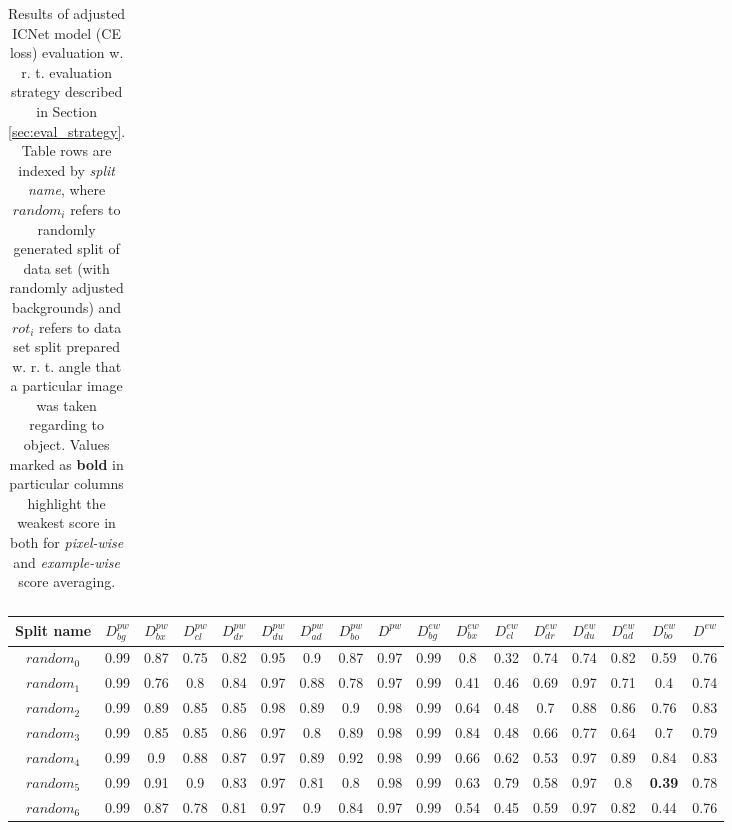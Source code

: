 \documentclass{article}
\begin{document}
\begin{center}
\begin{table}[H]
\begin{tabular}{ |c|c|c|c|c|c|c|c|c||c|c|c|c|c|c|c|c| }
\end{tabular} 
\caption{Results of adjusted ICNet \cite{icnet} model (CE loss) evaluation w. r. t. evaluation strategy described in Section \ref{sec:eval_strategy}. Table rows are indexed by \textit{split name}, where $random_i$ refers to randomly generated split of data set (with randomly adjusted backgrounds) and $rot_i$ refers to data set split prepared w. r. t. angle that a particular image was taken regarding to object. Values marked as \textbf{bold} in particular columns highlight the weakest score in both for \textit{pixel-wise} and \textit{example-wise} score averaging.}
\label{tab:icnet_ce_results}
\end{table}
\end{center}


\begin{center}
\begin{table}[H]
\tiny \renewcommand{\arraystretch}{1.5} \begin{tabular}{ |c|c|c|c|c|c|c|c|c||c|c|c|c|c|c|c|c| } \hline Split name & $D^{pw}_{bg}$ & $D^{pw}_{bx}$ & $D^{pw}_{cl}$ & $D^{pw}_{dr}$ & $D^{pw}_{du}$ & $D^{pw}_{ad}$ & $D^{pw}_{bo}$ & $D^{pw}$ &  $D^{ew}_{bg}$ & $D^{ew}_{bx}$ & $D^{ew}_{cl}$ & $D^{ew}_{dr}$ & $D^{ew}_{du}$ & $D^{ew}_{ad}$ & $D^{ew}_{bo}$ & $D^{ew}$ \\ [1.05ex] \hline 
$random_0$ &  0.99 & 0.87 & 0.75 & 0.82 & 0.95 & 0.9 & 0.87 & 0.97 &  0.99 & 0.8 & 0.32 & 0.74 & 0.74 & 0.82 & 0.59 & 0.76 \\ \hline 
$random_1$ &  0.99 & 0.76 & 0.8 & 0.84 & 0.97 & 0.88 & 0.78 & 0.97 &  0.99 & 0.41 & 0.46 & 0.69 & 0.97 & 0.71 & 0.4 & 0.74 \\ \hline 
$random_2$ &  0.99 & 0.89 & 0.85 & 0.85 & 0.98 & 0.89 & 0.9 & 0.98 &  0.99 & 0.64 & 0.48 & 0.7 & 0.88 & 0.86 & 0.76 & 0.83 \\ \hline 
$random_3$ &  0.99 & 0.85 & 0.85 & 0.86 & 0.97 & 0.8 & 0.89 & 0.98 &  0.99 & 0.84 & 0.48 & 0.66 & 0.77 & 0.64 & 0.7 & 0.79 \\ \hline 
$random_4$ &  0.99 & 0.9 & 0.88 & 0.87 & 0.97 & 0.89 & 0.92 & 0.98 &  0.99 & 0.66 & 0.62 & 0.53 & 0.97 & 0.89 & 0.84 & 0.83 \\ \hline 
$random_5$ &  0.99 & 0.91 & 0.9 & 0.83 & 0.97 & 0.81 & 0.8 & 0.98 &  0.99 & 0.63 & 0.79 & 0.58 & 0.97 & 0.8 & \textbf{0.39} & 0.78 \\ \hline 
$random_6$ &  0.99 & 0.87 & 0.78 & 0.81 & 0.97 & 0.9 & 0.84 & 0.97 &  0.99 & 0.54 & 0.45 & 0.59 & 0.97 & 0.82 & 0.44 & 0.76 \\ \hline 

\end{tabular}
\end{table}
\end{center}
\end{document}
